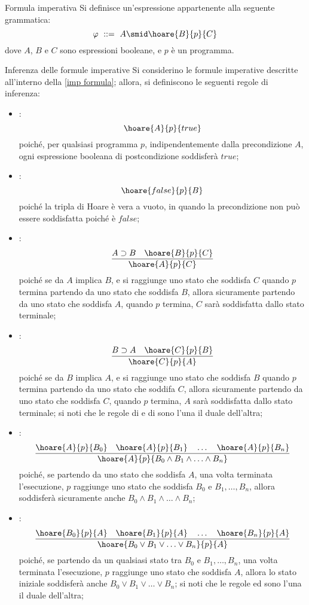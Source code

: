 \documentclass[a4paper, 12pt]{report}
\begin{document}
    \begin{frameddefn}[label={imp formula}]{Formula imperativa}
        Si definisce  un'espressione appartenente alla seguente grammatica: $$\varphi \ ::= \ A \smid \hoare{B}{p}{C}$$ dove $A$, $B$ e $C$ sono espressioni booleane, e $p$ è un programma.
    \end{frameddefn}

    \begin{framedprop}{Inferenza delle formule imperative}
        Si considerino le formule imperative descritte all'interno della \cref{imp formula}; allora, si definiscono le seguenti regole di inferenza:

        \begin{itemize}
            \item {}: $$\hoare{A}{p}{true}$$ poiché, per qualsiasi programma $p$, indipendentemente dalla precondizione $A$, ogni espressione booleana di postcondizione soddisferà $true$;
            \item {}: $$\hoare{false}{p}{B}$$ poiché la tripla di Hoare è vera a vuoto, in quando la precondizione non può essere soddisfatta poiché è $false$;
            \item {}: $$\dfrac{A \supset B \quad \hoare{B}{p}{C}}{\hoare{A}{p}{C}}$$ poiché se da $A$ implica $B$, e si raggiunge uno stato che soddisfa $C$ quando $p$ termina partendo da uno stato che soddisfa $B$, allora sicuramente partendo da uno stato che soddisfa $A$, quando $p$ termina, $C$ sarà soddisfatta dallo stato terminale;
            \item {}: $$\dfrac{B \supset A \quad \hoare{C}{p}{B}}{\hoare{C}{p}{A}}$$ poiché se da $B$ implica $A$, e si raggiunge uno stato che soddisfa $B$ quando $p$ termina partendo da uno stato che soddifa $C$, allora sicuramente partendo da uno stato che soddisfa $C$, quando $p$ termina, $A$ sarà soddisfatta dallo stato terminale; si noti che le regole di  e di  sono l'una il duale dell'altra;
            \item {}: $$\dfrac{\hoare{A}{p}{B_0} \quad \hoare{A}{p}{B_1} \quad \ldots \quad \hoare{A}{p}{B_n}}{\hoare{A}{p}{B_0 \land B_1 \land \ldots \land B_n}}$$ poiché, se partendo da uno stato che soddisfa $A$, una volta terminata l'esecuzione, $p$ raggiunge uno stato che soddisfa $B_0$ e $B_1, \ldots, B_n$, allora soddisferà sicuramente anche $B_0 \land B_1 \land \ldots \land B_n$;
            \item {}: $$\dfrac{\hoare{B_0}{p}{A} \quad \hoare{B_1}{p}{A} \quad \ldots \quad \hoare{B_n}{p}{A}}{\hoare{B_0 \lor B_1 \lor \ldots \lor B_n}{p}{A}}$$ poiché, se partendo da un qualsiasi stato tra $B_0$ e $B_1, \ldots, B_n$, una volta terminata l'esecuzione, $p$ raggiunge uno stato che soddisfa $A$, allora lo stato iniziale soddisferà anche $B_0 \lor B_1 \lor \ldots \lor B_n$; si noti che le regole  ed  sono l'una il duale dell'altra;
        \end{itemize}
    \end{framedprop}
\end{document}
